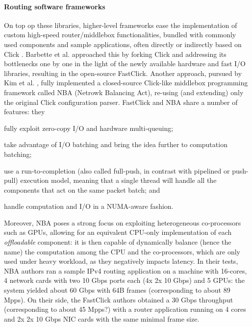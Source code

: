 \documentclass[11pt,a4paper,twoside,titlepage,openany]{book}
\begin{document}
\paragraph{Routing software frameworks} On top op these libraries, higher-level frameworks ease the implementation of custom high-speed router/middlebox functionalities, bundled with commonly used components and sample applications, often directly or indirectly based on Click \cite{click}.
Barbette et al. \cite{fastclick} approached this by forking Click and addressing its bottlenecks one by one in the light of the newly available hardware and fast I/O libraries, resulting in the open-source FastClick. Another approach, pursued by Kim et al. \cite{nba}, fully implemented a closed-source Click-like middlebox programming framework called NBA (Netrowk Balancing Act), re-using (and extending) only the original Click configuration parser. %
FastClick and NBA share a number of features: they
\begin{inlineenum}
\item fully exploit zero-copy I/O and hardware multi-queuing;
\item take advantage of I/O batching and bring the idea further to computation batching;
\item use a run-to-completion (also called full-push, in contrast with pipelined or push-pull) execution model, meaning that a single thread will handle all the components that act on the same packet batch; and
\item handle computation and I/O in a \gls{NUMA}-aware fashion.
\end{inlineenum}
Moreover, NBA poses a strong focus on exploiting heterogeneous co-processors such as GPUs, allowing for an equivalent CPU-only implementation of each \emph{offloadable} component: it is then capable of dynamically balance (hence the name) the computation among the CPU and the co-processors, which are only used under heavy workload, as they negatively impacts latency. In their tests, NBA authors ran a sample IPv4 routing application on a machine with 16-cores, 4 network cards with two 10 Gbps ports each (4x 2x 10 Gbps) and 5 GPUs: the system yielded about 60 Gbps with 64B frames (corresponding to about 89 \gls{Mpps}). On their side, the FastClick authors obtained a 30 Gbps throughput (corresponding to about 45 \gls{Mpps}?) with a router application running on 4 cores and 2x 2x 10 Gbps NIC cards with the same minimal frame size.
\end{document}
